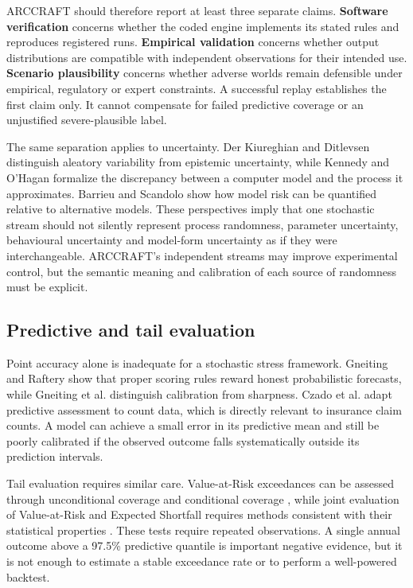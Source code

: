 ARCCRAFT should therefore report at least three separate claims. \textbf{Software verification} concerns whether the coded engine implements its stated rules and reproduces registered runs. \textbf{Empirical validation} concerns whether output distributions are compatible with independent observations for their intended use. \textbf{Scenario plausibility} concerns whether adverse worlds remain defensible under empirical, regulatory or expert constraints. A successful replay establishes the first claim only. It cannot compensate for failed predictive coverage or an unjustified severe-plausible label.

The same separation applies to uncertainty. Der Kiureghian and Ditlevsen \cite{DerKiureghian2009} distinguish aleatory variability from epistemic uncertainty, while Kennedy and O'Hagan \cite{Kennedy2001} formalize the discrepancy between a computer model and the process it approximates. Barrieu and Scandolo \cite{Barrieu2015} show how model risk can be quantified relative to alternative models. These perspectives imply that one stochastic stream should not silently represent process randomness, parameter uncertainty, behavioural uncertainty and model-form uncertainty as if they were interchangeable. ARCCRAFT's independent streams may improve experimental control, but the semantic meaning and calibration of each source of randomness must be explicit.

\subsection{Predictive and tail evaluation}\label{sec:predictive-and-tail-evaluation}

Point accuracy alone is inadequate for a stochastic stress framework. Gneiting and Raftery \cite{Gneiting2007Scoring} show that proper scoring rules reward honest probabilistic forecasts, while Gneiting et al. \cite{Gneiting2007Calibration} distinguish calibration from sharpness. Czado et al. \cite{Czado2009} adapt predictive assessment to count data, which is directly relevant to insurance claim counts. A model can achieve a small error in its predictive mean and still be poorly calibrated if the observed outcome falls systematically outside its prediction intervals.

Tail evaluation requires similar care. Value-at-Risk exceedances can be assessed through unconditional coverage \cite{Kupiec1995} and conditional coverage \cite{Christoffersen1998}, while joint evaluation of Value-at-Risk and Expected Shortfall requires methods consistent with their statistical properties \cite{Nolde2017}. These tests require repeated observations. A single annual outcome above a 97.5\% predictive quantile is important negative evidence, but it is not enough to estimate a stable exceedance rate or to perform a well-powered backtest.

